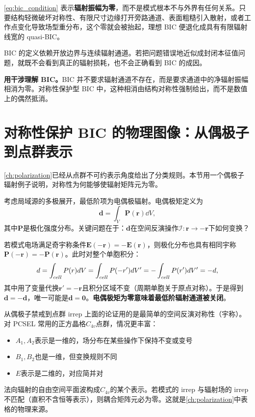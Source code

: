\cref{eq:bic_condition} 表示\textbf{辐射振幅为零}，而不是模式根本不与外界有任何关系。只要结构轻微破坏对称性、有限尺寸边缘打开旁路通道、表面粗糙引入散射，或者工作点变化导致场型重分布，这个零就会被抬起，理想 BIC 便退化成具有有限辐射线宽的 quasi-BIC。

BIC 的定义依赖开放边界与连续辐射通道。若把问题错误地近似成封闭本征值问题，就既不会看到真正的辐射损耗，也不会正确看到 BIC 的成因。

\textbf{用干涉理解 BIC。}BIC 并不要求辐射通道不存在，而是要求通道中的净辐射振幅相消为零。对称性保护型 BIC 中，这种相消由结构对称性强制给出，而不是数值上的偶然抵消。

\section{对称性保护 BIC 的物理图像：从偶极子到点群表示}
\label{sec:symmetry-bic-intuitive}
\cref{ch:polarization}已经从点群不可约表示角度给出了分类规则。本节用一个偶极子辐射例子说明，对称性为何能够使辐射矩阵元为零。

考虑局域源的多极展开，最低阶项为电偶极辐射。电偶极矩定义为
\begin{equation}
\bm{d} = \int_V \bm{P}(\bm{r}) \dd V,
\label{eq:dipole_moment}
\end{equation}
其中$\bm{P}$是极化强度分布。关键问题在于：$\bm{d}$在空间反演操作$\mathcal{I}:\bm{r}\to-\bm{r}$下如何变换？

若模式电场满足奇宇称条件$\bm{E}(-\bm{r}) = -\bm{E}(\bm{r})$，则极化分布也具有相同宇称$\bm{P}(-\bm{r}) = -\bm{P}(\bm{r})$。此时对整个单胞积分：
\begin{equation}
\bm{d} = \int_{\rm cell} \bm{P}(\bm{r}) \dd V
      = \int_{\rm cell} \bm{P}(-\bm{r}') \dd V'
      = -\int_{\rm cell} \bm{P}(\bm{r}') \dd V'
      = -\bm{d},
\end{equation}
其中用了变量代换$\bm{r}'=-\bm{r}$且积分区域不变（周期单胞关于原点对称）。于是得到$\bm{d} = -\bm{d}$，唯一可能是$\bm{d}=\bm{0}$。\textbf{电偶极矩为零意味着最低阶辐射通道被关闭}。

\begin{NoteBox}{从偶极子禁戒到点群 irrep}
上面的论证用的是最简单的空间反演对称性（宇称）。对 PCSEL 常用的正方晶格$C_{4v}$点群，情况更丰富：
\begin{itemize}
  \item $A_1,A_2$表示是一维的，场分布在某些操作下保持不变或变号
  \item $B_1,B_2$也是一维，但变换规则不同
  \item $E$表示是二维的，对应简并对
\end{itemize}
法向辐射的自由空间平面波构成$C_{4v}$的某个表示。若模式的 irrep 与辐射场的 irrep 不匹配（直积不含恒等表示），则耦合矩阵元必为零。这就是\cref{ch:polarization}中表格的物理来源。
\end{NoteBox}

